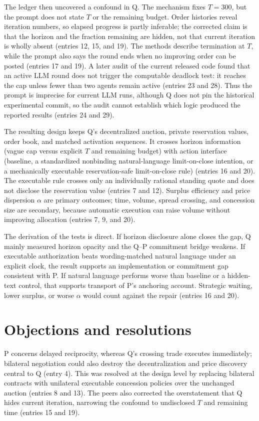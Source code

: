 \documentclass{article}
\begin{document}
The ledger then uncovered a confound in Q. The mechanism fixes $T=300$, but the prompt does not state $T$ or the remaining budget. Order histories reveal iteration numbers, so elapsed progress is partly inferable; the corrected claim is that the horizon and the fraction remaining are hidden, not that current iteration is wholly absent (entries 12, 15, and 19). The methods describe termination at $T$, while the prompt also says the round ends when no improving order can be posted (entries 17 and 19). A later audit of the current released code found that an active LLM round does not trigger the computable deadlock test: it reaches the cap unless fewer than two agents remain active (entries 23 and 28). Thus the prompt is imprecise for current LLM runs, although Q does not pin the historical experimental commit, so the audit cannot establish which logic produced the reported results (entries 24 and 29).

The resulting design keeps Q's decentralized auction, private reservation values, order book, and matched activation sequences. It crosses horizon information (vague cap versus explicit $T$ and remaining budget) with action interface (baseline, a standardized nonbinding natural-language limit-on-close intention, or a mechanically executable reservation-safe limit-on-close rule) (entries 16 and 20). The executable rule crosses only an individually rational standing quote and does not disclose the reservation value (entries 7 and 12). Surplus efficiency and price dispersion $\alpha$ are primary outcomes; time, volume, spread crossing, and concession size are secondary, because automatic execution can raise volume without improving allocation (entries 7, 9, and 20).

The derivation of the tests is direct. If horizon disclosure alone closes the gap, Q mainly measured horizon opacity and the Q--P commitment bridge weakens. If executable authorization beats wording-matched natural language under an explicit clock, the result supports an implementation or commitment gap consistent with P. If natural language performs worse than baseline or a hidden-text control, that supports transport of P's anchoring account. Strategic waiting, lower surplus, or worse $\alpha$ would count against the repair (entries 16 and 20).

\section*{Objections and resolutions}
P concerns delayed reciprocity, whereas Q's crossing trade executes immediately; bilateral negotiation could also destroy the decentralization and price discovery central to Q (entry 4). This was resolved at the design level by replacing bilateral contracts with unilateral executable concession policies over the unchanged auction (entries 8 and 13). The peers also corrected the overstatement that Q hides current iteration, narrowing the confound to undisclosed $T$ and remaining time (entries 15 and 19).
\end{document}
